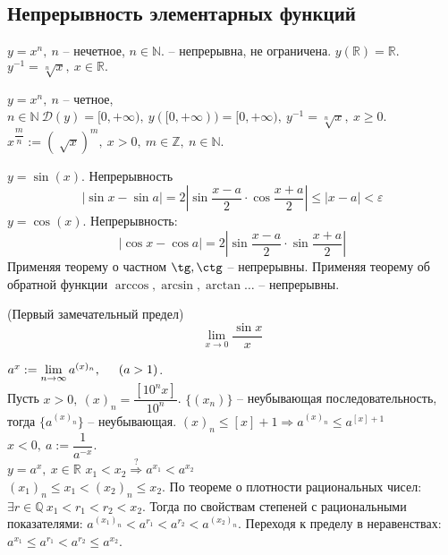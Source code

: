 \begin{multicols}{2}
\subsection*{Непрерывность элементарных функций}
\begin{enumerate*}
	\item $y = x^n,\ n$ -- нечетное, $n \in\mathbb N$. -- непрерывна, не ограничена. $y(\mathbb R) = \mathbb R$. $y^{-1} = \sqrt[n]{x},\ x\in\mathbb R.$
	\item $y = x^n, \ n$ -- четное, $n \in\mathbb N\ \mathscr{D}(y) = [0, +\infty),\ y([0,+\infty)) = [0, +\infty),\ y^{-1} = \sqrt[n]{x},\ x\geq 0$. \\$x^{\dfrac{m}{n}} := (\sqrt[]{x})^m,\ x > 0,\ m\in\mathbb Z,\ n\in\mathbb N.$ 
	\item $y = \sin(x)$. Непрерывность \[
        |\sin x - \sin a| = 2|\sin \dfrac{x-a}{2}\cdot \cos \dfrac{x+a}{2}| \leq |x-a| < \varepsilon
    \]
    $y = \cos (x)$. Непрерывность: \[
        |\cos x - \cos a| = 2|\sin \dfrac{x-a}{2}\cdot \sin \dfrac{x+a}{2}|
        \] Применяя теорему о частном $\tg, \ctg$ -- непрерывны. Применяя теорему об обратной функции $\arccos, \arcsin, \arctan\ldots$ -- непрерывны.
\end{enumerate*}
\begin{theorema}{(Первый замечательный предел)}{}
    \[
        \lim\limits_{x\to 0} \dfrac{\sin x}{x}
    \]
\end{theorema}
\begin{enumerate*}
	\setcounter{enumi}{3}
	\item $a^x := \lim\limits_{n\to \infty} a^{(x)_n},\hspace{0.5cm} (a > 1)$.\\ Пусть $x>0,\ (x)_n = \dfrac{[10^nx]}{10^n}$. $\{(x_n)\}$ -- неубывающая последовательность, тогда $\{a^{(x)_n}\}$ -- неубывающая. $(x)_n \leq [x] + 1 \Rightarrow a^{(x)_n} \leq a^{[x] + 1}$\\$x < 0,\ a:= \dfrac{1}{a^{-x}}$.\\
	$y = a^x,\ x\in\mathbb R$ $x_1 < x_2 \overset{?}{\Rightarrow} a^{x_1} < a^{x_2}$\\$(x_1)_n \leq x_1 < (x_2)_n \leq x_2$. По теореме о плотности рациональных чисел: $\exists r \in \mathbb Q\ x_1 < r_1 < r_2 < x_2$. Тогда по свойствам степеней с рациональными показателями: $a^{(x_1)_n} < a^{r_1} < a^{r_2} < a^{(x_2)_n}$. Переходя к пределу в неравенствах: $a^{x_1} \leq a^{r_1} < a^{r_2} \leq a^{x_2}$.
\end{enumerate*}
\begin{lemma}{}{}

\end{lemma}
\end{multicols}
